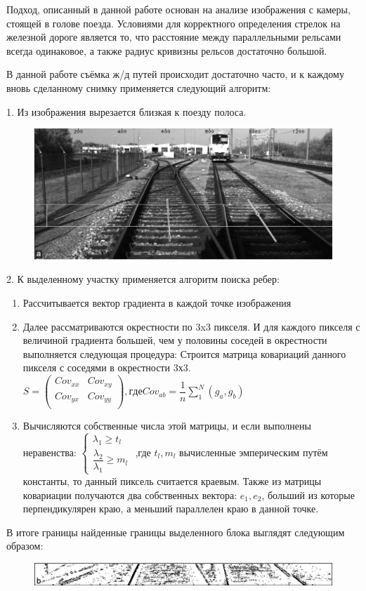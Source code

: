 Подход, описанный в данной работе основан на анализе изображения с камеры, стоящей в голове
поезда. Условиями для корректного определения стрелок на железной дороге является то, что
расстояние между параллельными рельсами всегда одинаковое, а также радиус кривизны рельсов
достаточно большой.

В данной работе съёмка ж/д путей происходит достаточно часто, и к каждому вновь сделанному снимку применяется следующий алгоритм:

1. Из изображения вырезается близкая к поезду полоса.
\begin{figure}[!h]
	\centering
	\includegraphics[width=0.9\linewidth]{pictures/screenshot001}
	\caption{}
	\label{fig:screenshot001}
\end{figure}

2. К выделенному участку применяется алгоритм поиска ребер: 
\begin{enumerate}
	\item Рассчитывается вектор градиента в каждой точке изображения
	\item Далее рассматриваются окрестности по 3x3 пикселя. И для каждого пикселя с величиной градиента большей, чем у половины соседей в окрестности выполняется следующая
	процедура: 
	Строится матрица ковариаций данного пикселя с соседями в окрестности 3х3. 
	$
	S = \left(
	\begin{array}{cccc}
	Cov_{xx} & Cov_{xy}\\
	Cov_{yx} & Cov_{yy}\\
	\end{array}
	\right), где
	Cov_{ab} = \dfrac{1}{n} \sum_{1}^{N} (g_a, g_b)
	$ 
	\item Вычисляются собственные числа этой матрицы, и если выполнены неравенства:
	$
	\begin{cases}
	\lambda_1 \geq t_l\\
	\dfrac{\lambda_2}{\lambda_1} \geq m_l 
	\end{cases}
	$
	,где $t_l, m_l$ вычисленные эмперическим путём константы, то данный пиксель считается
	краевым.
	Также из матрицы ковариации получаются два собственных вектора:
	$e_1, e_2$, больший из которые перпендикулярен краю, а меньший параллелен краю в данной точке.
\end{enumerate}
В итоге границы найденные границы выделенного блока выглядят следующим образом:
\begin{figure}[!h]
	\centering
	\includegraphics[width=0.9\linewidth]{pictures/screenshot002}
	\caption{}
	\label{fig:screenshot002}
\end{figure}

